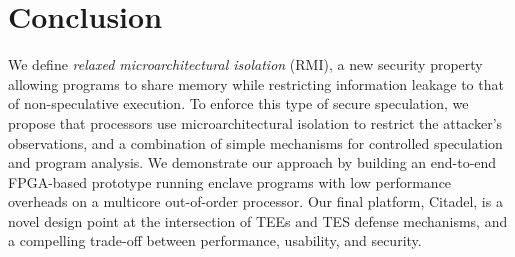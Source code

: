 \section{Conclusion}

We define \emph{relaxed microarchitectural isolation} (RMI), a new security property allowing programs to share memory while restricting information leakage to that of non-speculative execution.
To enforce this type of secure speculation, we propose that processors use microarchitectural isolation to restrict the attacker's observations, and a combination of simple mechanisms for controlled speculation and program analysis.
We demonstrate our approach by building an end-to-end FPGA-based prototype running enclave programs with low performance overheads on a multicore out-of-order processor.
Our final platform, Citadel, is a novel design point at the intersection of TEEs and TES defense mechanisms, and a compelling trade-off between performance, usability, and security.
